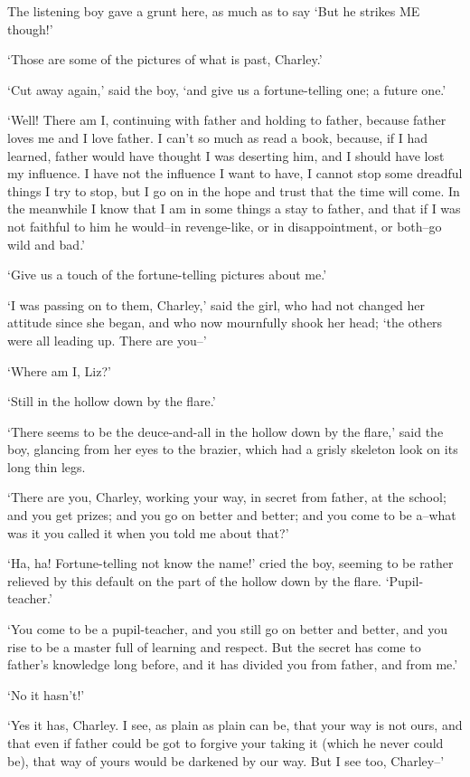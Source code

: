 The listening boy gave a grunt here, as much as to say ‘But he strikes
ME though!’

‘Those are some of the pictures of what is past, Charley.’

‘Cut away again,’ said the boy, ‘and give us a fortune-telling one; a
future one.’

‘Well! There am I, continuing with father and holding to father, because
father loves me and I love father. I can’t so much as read a book,
because, if I had learned, father would have thought I was deserting
him, and I should have lost my influence. I have not the influence I
want to have, I cannot stop some dreadful things I try to stop, but I
go on in the hope and trust that the time will come. In the meanwhile
I know that I am in some things a stay to father, and that if I was
not faithful to him he would--in revenge-like, or in disappointment, or
both--go wild and bad.’

‘Give us a touch of the fortune-telling pictures about me.’

‘I was passing on to them, Charley,’ said the girl, who had not changed
her attitude since she began, and who now mournfully shook her head;
‘the others were all leading up. There are you--’

‘Where am I, Liz?’

‘Still in the hollow down by the flare.’

‘There seems to be the deuce-and-all in the hollow down by the flare,’
said the boy, glancing from her eyes to the brazier, which had a grisly
skeleton look on its long thin legs.

‘There are you, Charley, working your way, in secret from father, at
the school; and you get prizes; and you go on better and better; and you
come to be a--what was it you called it when you told me about that?’

‘Ha, ha! Fortune-telling not know the name!’ cried the boy, seeming to
be rather relieved by this default on the part of the hollow down by the
flare. ‘Pupil-teacher.’

‘You come to be a pupil-teacher, and you still go on better and better,
and you rise to be a master full of learning and respect. But the secret
has come to father’s knowledge long before, and it has divided you from
father, and from me.’

‘No it hasn’t!’

‘Yes it has, Charley. I see, as plain as plain can be, that your way is
not ours, and that even if father could be got to forgive your taking
it (which he never could be), that way of yours would be darkened by our
way. But I see too, Charley--’

